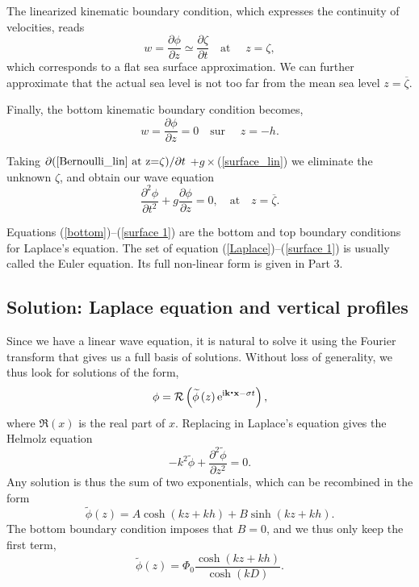 The linearized kinematic boundary condition, which expresses the continuity of velocities, reads
\begin{equation}
    w = \frac{\partial \phi }{\partial z} \simeq \frac{\partial \zeta}{\partial t}
    \quad \mbox{at\ }\quad z=\zeta,  \label{surface_lin}
\end{equation} which corresponds to a flat sea surface approximation. 
We can further approximate that the actual sea level is not too far from the mean sea level $z=\overline{\zeta}$. 


Finally, the bottom kinematic boundary condition becomes, 
\begin{equation}
    w=\frac{\partial \phi }{\partial z}=0 \quad \mbox{sur\ }\quad z=-h.  \label{bottom}
\end{equation}

Taking  $\partial (\ref{Bernoulli_lin} \textrm{~at z=}\zeta)/\partial t $
+$g\times$(\ref{surface_lin}) we eliminate the unknown $\zeta$, and obtain our 
wave equation 
\begin{equation}
  \frac{\partial^2{\phi}}{\partial{t^2}}+g\frac{\partial\phi}{\partial z}=0, \quad \mbox{at}
\quad  z=\overline{\zeta}. \label{surface 1}
\end{equation}

Equations (\ref{bottom})--(\ref{surface 1}) are the bottom and top boundary conditions for Laplace's equation. The 
set of equation  (\ref{Laplace})--(\ref{surface 1}) is
usually called the Euler equation. Its full non-linear form is given in Part 3. 
 
\subsection{Solution: Laplace equation and vertical profiles}
Since we have a linear wave equation, it is natural to solve it 
using the Fourier transform that gives us a full basis of solutions. Without loss of generality, 
we thus look for solutions of the form, 
\begin{equation}
    \phi={\cal R} \left(\widetilde{\phi}\left(z\right)
     \mathrm{e}^{\mathrm{i}{\mathbf k}\mbox{\boldmath $\cdot$}{\mathbf x} - \sigma t} \right),
    \label{phi1}
\end{equation}
where $\Re(x)$ is the real part of $x$. Replacing in Laplace's equation gives the Helmolz equation 
\begin{equation}
    -k^2 \widetilde{\phi}+\frac{\partial^2 \widetilde{\phi}}{\partial z^2}=0.
    \label{Helmholz}
\end{equation}
Any solution is thus the sum of two exponentials, which can be recombined in the form 
\begin{equation}
    \widetilde{\phi}(z)=A \cosh\left(kz+kh \right)
        + B \sinh\left(kz+kh \right).
\end{equation}
The bottom boundary condition imposes that $B=0$, and we thus only keep the first term,
\begin{equation}
    \widetilde{\phi}\left(z\right)=\Phi_0
    \frac{\cosh\left(kz+kh\right)}{\cosh\left(kD\right)}.
    \label{cosh}
\end{equation}

